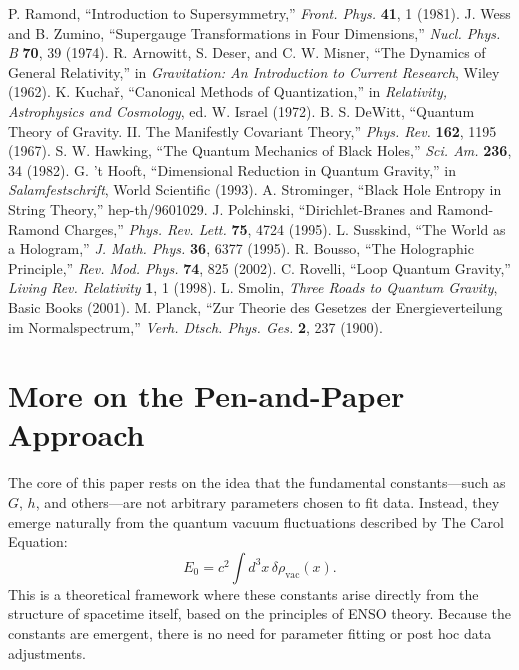 \documentclass[12pt]{article}
\begin{document}
\begin{thebibliography}{33}
 P. Ramond, ``Introduction to Supersymmetry,'' \textit{Front. Phys.} \textbf{41}, 1 (1981).
 J. Wess and B. Zumino, ``Supergauge Transformations in Four Dimensions,'' \textit{Nucl. Phys. B} \textbf{70}, 39 (1974).
 R. Arnowitt, S. Deser, and C. W. Misner, ``The Dynamics of General Relativity,'' in \textit{Gravitation: An Introduction to Current Research}, Wiley (1962).
 K. Kuchař, ``Canonical Methods of Quantization,'' in \textit{Relativity, Astrophysics and Cosmology}, ed. W. Israel (1972).
 B. S. DeWitt, ``Quantum Theory of Gravity. II. The Manifestly Covariant Theory,'' \textit{Phys. Rev.} \textbf{162}, 1195 (1967).
 S. W. Hawking, ``The Quantum Mechanics of Black Holes,'' \textit{Sci. Am.} \textbf{236}, 34 (1982).
 G. 't Hooft, ``Dimensional Reduction in Quantum Gravity,'' in \textit{Salamfestschrift}, World Scientific (1993).
 A. Strominger, ``Black Hole Entropy in String Theory,'' hep-th/9601029.
 J. Polchinski, ``Dirichlet-Branes and Ramond-Ramond Charges,'' \textit{Phys. Rev. Lett.} \textbf{75}, 4724 (1995).
 L. Susskind, ``The World as a Hologram,'' \textit{J. Math. Phys.} \textbf{36}, 6377 (1995).
 R. Bousso, ``The Holographic Principle,'' \textit{Rev. Mod. Phys.} \textbf{74}, 825 (2002).
 C. Rovelli, ``Loop Quantum Gravity,'' \textit{Living Rev. Relativity} \textbf{1}, 1 (1998).
 L. Smolin, \textit{Three Roads to Quantum Gravity}, Basic Books (2001).
 M. Planck, ``Zur Theorie des Gesetzes der Energieverteilung im Normalspectrum,'' \textit{Verh. Dtsch. Phys. Ges.} \textbf{2}, 237 (1900).
\end{thebibliography}

\appendix
\section{More on the Pen-and-Paper Approach}
\label{app:defense}
The core of this paper rests on the idea that the fundamental constants—such as \(G\), \(h\), and others—are not arbitrary parameters chosen to fit data. Instead, they emerge naturally from the quantum vacuum fluctuations described by The Carol Equation:
\[
E_0 = c^2 \int d^3x \, \delta \rho_{\text{vac}}(x).
\]
This is a theoretical framework where these constants arise directly from the structure of spacetime itself, based on the principles of ENSO theory. Because the constants are emergent, there is no need for parameter fitting or post hoc data adjustments.
\end{document}
